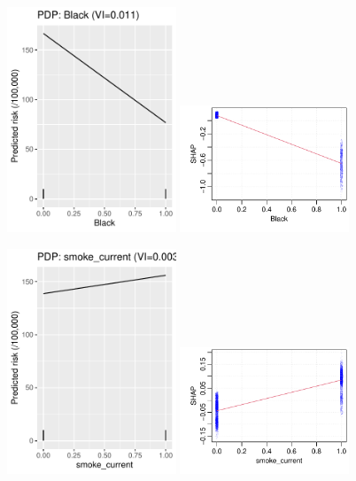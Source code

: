 \documentclass[12pt]{article}
\begin{document}
\begin{figure}[h]
\centering
\includegraphics[width=0.45\textwidth]{figures/pdp/Black.pdf}
\includegraphics[width=0.45\textwidth]{figures/shap/Black.pdf}
\end{figure}
\begin{figure}[h]
\centering
\includegraphics[width=0.45\textwidth]{figures/pdp/smoke_current.pdf}
\includegraphics[width=0.45\textwidth]{figures/shap/smoke_current.pdf}
\end{figure}
\end{document}
